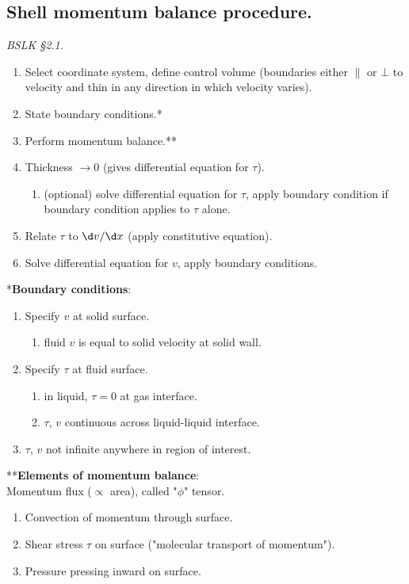 \subsection{Shell momentum balance procedure.}
\textit{BSLK §2.1.}
\begin{enumerate}
	\item Select coordinate system, define control volume (boundaries either $\parallel$ or $\bot$ to velocity and thin in any direction in which velocity varies).
	\item State boundary conditions.*
	\item Perform momentum balance.**
	\item Thickness $\to0$ (gives differential equation for $\tau$).
	      \begin{enumerate}
		      \item (optional) solve differential equation for $\tau$, apply boundary condition if boundary condition applies to $\tau$ alone.
	      \end{enumerate}
	\item Relate $\tau$ to $\d v/\d x$ (apply constitutive equation).
	\item Solve differential equation for $v$, apply boundary conditions.
\end{enumerate}
*\textbf{Boundary conditions}:
\begin{enumerate}
	\item Specify $v$ at solid surface.
	      \begin{enumerate}
		      \item fluid $v$ is equal to solid velocity at solid wall.
	      \end{enumerate}
	\item Specify $\tau$ at fluid surface.
	      \begin{enumerate}
		      \item in liquid, $\tau=0$ at gas interface.
		      \item $\tau$, $v$ continuous across liquid-liquid interface.
	      \end{enumerate}
	\item $\tau$, $v$ not infinite anywhere in region of interest.
\end{enumerate}
**\textbf{Elements of momentum balance}:\\
Momentum flux ($\propto$ area), called "$\phi$" tensor.
\begin{enumerate}
	\item Convection of momentum through surface.
	\item Shear stress $\tau$ on surface ("molecular transport of momentum").
	\item Pressure pressing inward on surface.
\end{enumerate}
